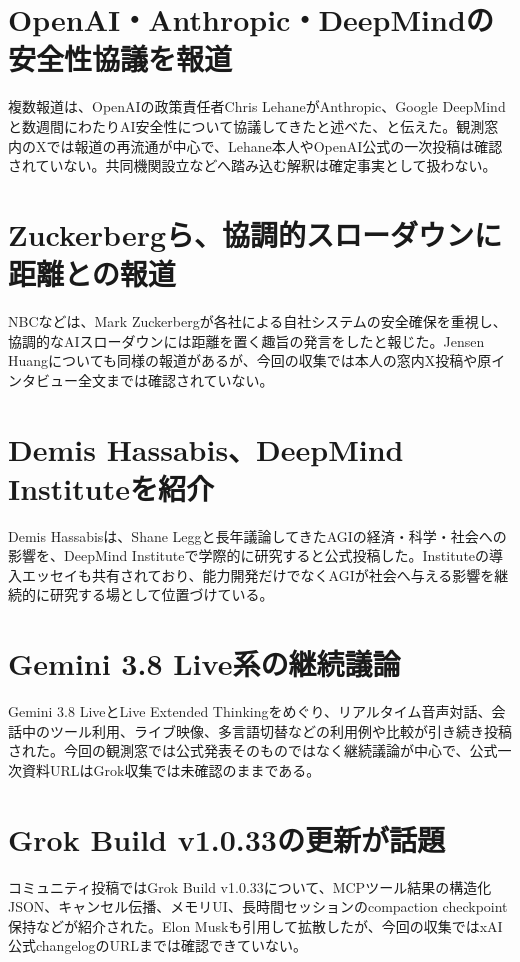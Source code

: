 \section{OpenAI・Anthropic・DeepMindの安全性協議を報道}
複数報道は、OpenAIの政策責任者Chris LehaneがAnthropic、Google DeepMindと数週間にわたりAI安全性について協議してきたと述べた、と伝えた。観測窓内のXでは報道の再流通が中心で、Lehane本人やOpenAI公式の一次投稿は確認されていない。共同機関設立などへ踏み込む解釈は確定事実として扱わない。

\section{Zuckerbergら、協調的スローダウンに距離との報道}
NBCなどは、Mark Zuckerbergが各社による自社システムの安全確保を重視し、協調的なAIスローダウンには距離を置く趣旨の発言をしたと報じた。Jensen Huangについても同様の報道があるが、今回の収集では本人の窓内X投稿や原インタビュー全文までは確認されていない。

\section{Demis Hassabis、DeepMind Instituteを紹介}
Demis Hassabisは、Shane Leggと長年議論してきたAGIの経済・科学・社会への影響を、DeepMind Instituteで学際的に研究すると公式投稿した。Instituteの導入エッセイも共有されており、能力開発だけでなくAGIが社会へ与える影響を継続的に研究する場として位置づけている。

\section{Gemini 3.8 Live系の継続議論}
Gemini 3.8 LiveとLive Extended Thinkingをめぐり、リアルタイム音声対話、会話中のツール利用、ライブ映像、多言語切替などの利用例や比較が引き続き投稿された。今回の観測窓では公式発表そのものではなく継続議論が中心で、公式一次資料URLはGrok収集では未確認のままである。

\section{Grok Build v1.0.33の更新が話題}
コミュニティ投稿ではGrok Build v1.0.33について、MCPツール結果の構造化JSON、キャンセル伝播、メモリUI、長時間セッションのcompaction checkpoint保持などが紹介された。Elon Muskも引用して拡散したが、今回の収集ではxAI公式changelogのURLまでは確認できていない。

